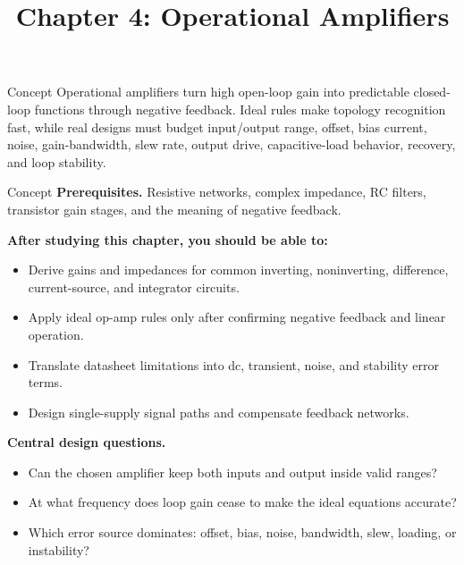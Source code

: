 \documentclass[10pt,letterpaper]{article}
\title{Chapter 4: Operational Amplifiers}
\author{}
\date{}
\begin{document}
\maketitle

\begin{CornellOverviewBox}{Concept}
Operational amplifiers turn high open-loop gain into predictable closed-loop functions through negative feedback. Ideal rules make topology recognition fast, while real designs must budget input/output range, offset, bias current, noise, gain-bandwidth, slew rate, output drive, capacitive-load behavior, recovery, and loop stability.
\end{CornellOverviewBox}
\begin{CornellOverviewBox}{Concept}
\textbf{Prerequisites.} Resistive networks, complex impedance, RC filters, transistor gain stages, and the meaning of negative feedback.

\textbf{After studying this chapter, you should be able to:}
\begin{itemize}
  \item Derive gains and impedances for common inverting, noninverting, difference, current-source, and integrator circuits.
  \item Apply ideal op-amp rules only after confirming negative feedback and linear operation.
  \item Translate datasheet limitations into dc, transient, noise, and stability error terms.
  \item Design single-supply signal paths and compensate feedback networks.
\end{itemize}\textbf{Central design questions.}
\begin{itemize}
  \item Can the chosen amplifier keep both inputs and output inside valid ranges?
  \item At what frequency does loop gain cease to make the ideal equations accurate?
  \item Which error source dominates: offset, bias, noise, bandwidth, slew, loading, or instability?
\end{itemize}\end{CornellOverviewBox}
\end{document}
